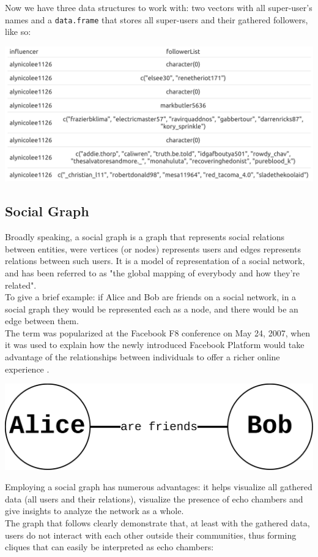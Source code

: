 Now we have three data structures to work with: two vectors with all super-user's names and a \verb+data.frame+ that stores all super-users and their gathered followers, like so: 

\aCapo{}
\includegraphics[width = .48\textwidth]{images/total_table_p23.png}

\subsection{Social Graph}
Broadly speaking, a social graph is a graph that represents social relations between entities, were vertices (or nodes) represents users and edges represents relations between such users. It is a model of representation of a social network, and has been referred to as "the global mapping of everybody and how they're related".\\ 
To give a brief example: if Alice and Bob are friends on a social network, in a social graph they would be represented each as a node, and there would be an edge between them.\\
The term was popularized at the Facebook F8 conference on May 24, 2007, when it was used to explain how the newly introduced Facebook Platform would take advantage of the relationships between individuals to offer a richer online experience \cite{wikiSAN}.

\aCapo{}
\includegraphics[width = .5\textwidth]{images/alice_bob_san.png}

Employing a social graph has numerous advantages: it helps visualize all gathered data (all users and their relations), visualize the presence of echo chambers and give insights to analyze the network as a whole. \\
The graph that follows clearly demonstrate that, at least with the gathered data, users do not interact with each other outside their communities, thus forming cliques that can easily be interpreted as echo chambers:
